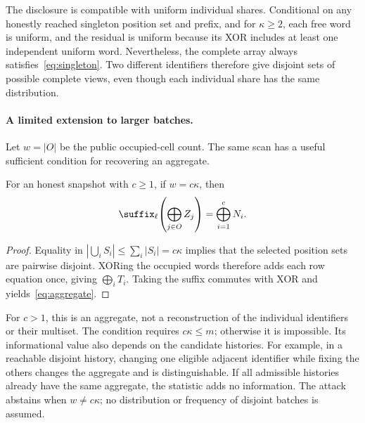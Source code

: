 The disclosure is compatible with uniform individual shares. Conditional on
any honestly reached singleton position set and prefix, and for $\kappa\geq2$,
each free word is uniform, and the residual is uniform because its XOR includes
at least one independent uniform word. Nevertheless, the complete array
always satisfies~\eqref{eq:singleton}. Two different identifiers therefore
give disjoint sets of possible complete views, even though each individual
share has the same distribution.

\paragraph{A limited extension to larger batches.}
Let $w=|O|$ be the public occupied-cell count. The same scan has a useful
sufficient condition for recovering an aggregate.

\begin{proposition}
\label{prop:disjoint}
For an honest snapshot with $c\geq1$, if $w=c\kappa$, then
\begin{equation}
 \suffix_\ell\!\left(\bigoplus_{j\in O}Z_j\right)
       =\bigoplus_{i=1}^{c}N_i.
 \label{eq:aggregate}
\end{equation}
\end{proposition}

\begin{proof}
Equality in
$|\bigcup_i S_i|\leq\sum_i|S_i|=c\kappa$ implies that the selected position
sets are pairwise disjoint. XORing the occupied words therefore adds each
row equation once, giving $\bigoplus_i T_i$. Taking the suffix commutes
with XOR and yields~\eqref{eq:aggregate}.
\end{proof}

For $c>1$, this is an aggregate, not a reconstruction of the individual
identifiers or their multiset. The condition requires $c\kappa\leq m$;
otherwise it is impossible. Its informational value also depends on the
candidate histories. For example, in a reachable disjoint history, changing
one eligible adjacent identifier while fixing the others changes the aggregate
and is distinguishable. If all admissible histories already have the same
aggregate, the statistic adds no information. The attack abstains when
$w\ne c\kappa$; no distribution or frequency of disjoint batches is assumed.

